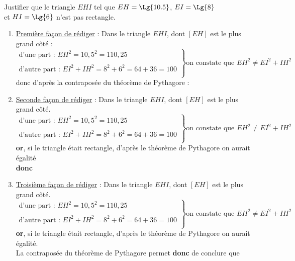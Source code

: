 \begin{methode*1}
    \exercice
    Justifier que le triangle $EHI$ tel que $EH=\Lg{10.5}$, $EI=\Lg{8}$\\ et $HI=\Lg{6}$ n'est pas rectangle.
    \correction
    \begin{enumerate}
        \item \underline{Première façon de rédiger} :
        Dans le triangle $EHI$, dont $[EH]$ est le plus grand côté :
        $$\left.\begin{array}{l}
        \text{d'une part : }EH^2=10,5^2=110,25\\
        \\
        \text{d'autre part : }EI^2+IH^2=8^2+6^2=64+36=100\\
        \end{array}
        \right\rbrace \text{on constate que }EH^2\not=EI^2+IH^2$$
        donc d'après la contraposée du théorème de Pythagore :\\ \medskip
        \item \underline{Seconde façon de rédiger} :
        Dans le triangle $EHI$, dont $[EH]$ est le plus grand côté.
        $$\left.\begin{array}{l}
        \text{d'une part : }EH^2=10,5^2=110,25\\
        \\
        \text{d'autre part : }EI^2+IH^2=8^2+6^2=64+36=100\\
        \end{array}
        \right\rbrace \text{on constate que }EH^2\not=EI^2+IH^2$$
        \textbf{or}, si le triangle était rectangle, d'après le théorème de Pythagore on aurait égalité\\
        \textbf{donc} \medskip
        \item \underline{Troisième façon de rédiger} :
        Dans le triangle $EHI$, dont $[EH]$ est le plus grand côté.
        $$\left.\begin{array}{l}
        \text{d'une part : }EH^2=10,5^2=110,25\\
        \\
        \text{d'autre part : }EI^2+IH^2=8^2+6^2=64+36=100\\
        \end{array}
        \right\rbrace \text{on constate que }EH^2\not=EI^2+IH^2$$
        \textbf{or}, si le triangle était rectangle, d'après le théorème de Pythagore on aurait égalité.\\
        La contraposée du théorème de Pythagore permet \textbf{donc} de conclure que 
    \end{enumerate}    
\end{methode*1}